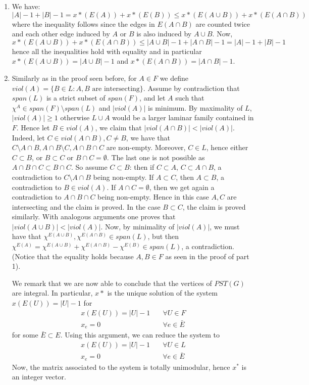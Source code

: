 \documentclass[11pt]{article}
\begin{document}
\begin{enumerate}[1)]
\begin{solution}
\begin{enumerate}
\item We have:
$$|A|−1 + |B|−1 = x*(E(A)) + x*(E(B)) ≤x*(E(A∪B)) + x*(E(A∩B))$$
where the inequality follows since the edges in $E(A∩B)$ are counted twice and each other
edge induced by $A$ or $B$ is also induced by $A∪B$. Now,
$$x*(E(A∪B)) + x*(E(A∩B)) ≤|A∪B|−1 + |A∩B|−1 = |A|−1 + |B|−1$$
hence all the inequalities hold with equality and in particular $x*(E(A∪B)) = |A∪B|−1$ and
$x*(E(A∩B)) = |A∩B|−1$.
\item  Similarly as in the proof seen before, for $A ∈ F$ we define $viol(A) = \{B ∈ L : A,B
\text{ are intersecting}\}$. Assume by contradiction that $span(L)$ is a strict subset of $span(F)$, and
let $A$ such that $χ^A ∈span(F) \setminus span(L)$ and $|viol(A)|$ is minimum. By maximality of $L$,
$|viol(A)|≥1$ otherwise $L∪A$ would be a larger laminar family contained in $F$. Hence let
$B ∈viol(A)$, we claim that $|viol(A∩B)|< |viol(A)|$. Indeed, let $C ∈viol(A∩B), C\neq B$,
we have that $C\setminus A∩B,A∩B\setminus C,A∩B∩C$ are non-empty. Moreover, $C ∈L$, hence either
$C ⊂B$, or $B ⊂C$ or $B∩C= \emptyset$. The last one is not possible as $A∩B∩C ⊂B∩C$. So assume
$C ⊂B$: then if $C ⊂A$, $C ⊂A∩B$, a contradiction to $C\setminus A∩B$ being non-empty. If $A⊂C$,
then $A⊂B$, a contradiction to $B ∈viol(A)$. If $A∩C= \emptyset$, then we get again a contradiction
to $A∩B ∩C$ being non-empty. Hence in this case $A,C$ are intersecting and the claim is
proved. In the case $B ⊂C$, the claim is proved similarly. With analogous arguments one
proves that $|viol(A∪B)|< |viol(A)|$. Now, by minimality of $|viol(A)|$, we must have that
$χ^{E(A∪B)},χ^{E(A∩B)} ∈span(L)$, but then $χ^{E(A)} = χ^{E(A∪B)} + χ^{E(A∩B)}−χ^{E(B)} ∈span(L)$, a
contradiction. (Notice that the equality holds because $A,B ∈F$ as seen in the proof of part
1).

\bigskip
We remark that we are now able to conclude that the vertices of $PST(G)$ are integral. In particular, $x*$ is the unique solution of the system $x(E(U)) = |U|−1$ for
\begin{align*}
 x(E(U)) = |U|−1 \quad &∀U ∈F \\
x_e = 0 \quad &∀e∈\bar{E}
\end{align*}
for some $\bar{E} ⊂E$. Using this argument, we can reduce the system to
\begin{align*}
x(E(U)) = |U|−1 & \quad ∀U ∈L \\
x_e = 0 & \quad ∀e∈\bar{E} 
\end{align*}
Now, the matrix associated to the system is totally unimodular, hence $x^*$ is an integer vector.
\end{enumerate}
\end{solution}






\end{enumerate}



  
\end{document}
